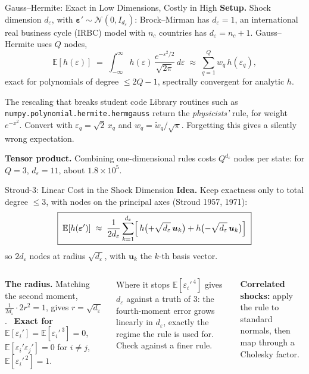 \documentclass[aspectratio=169,11pt]{beamer}
\newcommand{\emphc}[1]{\textcolor{harvardcrimson}{#1}}
\newcommand{\E}[1]{\mathbb{E}\!\left[#1\right]}
\begin{document}
\begin{frame}{Gauss--Hermite: Exact in Low Dimensions, Costly in High}
\textbf{Setup.} Shock dimension $d_\varepsilon$, with $\bm\varepsilon' \sim \mathcal{N}(0, I_{d_\varepsilon})$: Brock--Mirman has $d_\varepsilon=1$, an international real business cycle (IRBC) model with $n_c$ countries has $d_\varepsilon=n_c+1$. Gauss--Hermite uses $Q$ nodes,
\[
\E{h(\varepsilon)} \;=\; \int_{-\infty}^{\infty} h(\varepsilon)\,\frac{e^{-\varepsilon^2/2}}{\sqrt{2\pi}}\,d\varepsilon \;\approx\; \sum_{q=1}^{Q} w_q\, h(\varepsilon_q),
\]
exact for polynomials of degree $\le 2Q-1$, spectrally convergent for analytic $h$.

\begin{alertblock}{The rescaling that breaks student code}
\footnotesize
Library routines such as \texttt{numpy.polynomial.hermite.hermgauss} return the \emph{physicists'} rule, for weight $e^{-x^2}$. Convert with $\varepsilon_q = \sqrt{2}\,x_q$ and $w_q = \tilde w_q/\sqrt{\pi}$. Forgetting this gives a silently wrong expectation.
\end{alertblock}

{\footnotesize \textbf{Tensor product.} Combining one-dimensional rules costs $Q^{d_\varepsilon}$ nodes per state: for $Q=3$, $d_\varepsilon=11$, about $1.8\times 10^5$.}
\end{frame}

\begin{frame}{Stroud-3: Linear Cost in the Shock Dimension}
\textbf{Idea.} Keep exactness only to total degree $\le 3$, with nodes on the principal axes (Stroud 1957, 1971):
\[
\boxed{\;
\E{h(\bm\varepsilon')} \;\approx\; \frac{1}{2d_\varepsilon} \sum_{k=1}^{d_\varepsilon} \Bigl[\, h\bigl(+\sqrt{d_\varepsilon}\,\bm{u}_k\bigr) + h\bigl(-\sqrt{d_\varepsilon}\,\bm{u}_k\bigr)\Bigr]
\;}
\]
so $2d_\varepsilon$ nodes at radius $\sqrt{d_\varepsilon}$, with $\bm{u}_k$ the $k$-th basis vector.

\begin{columns}[T]
{\footnotesize \textbf{The radius.} Matching the second moment, $\tfrac{1}{2d_\varepsilon}\cdot 2 r^2 = 1$, gives $r = \sqrt{d_\varepsilon}$. \ \textbf{Exact for} $\E{\varepsilon_i'} = \E{\varepsilon_i'^{\,3}} = 0$, $\E{\varepsilon_i' \varepsilon_j'} = 0$ for $i\neq j$, $\E{\varepsilon_i'^{\,2}} = 1$.}

\begin{alertblock}{Where it stops}
\footnotesize
$\E{\varepsilon_i'^{\,4}}$ gives $d_\varepsilon$ against a truth of $3$: the fourth-moment error \emphc{grows linearly in $d_\varepsilon$}, exactly the regime the rule is used for. Check against a finer rule.
\end{alertblock}

{\footnotesize \textbf{Correlated shocks:} apply the rule to standard normals, then map through a Cholesky factor.}
\end{columns}
\end{frame}
\end{document}
